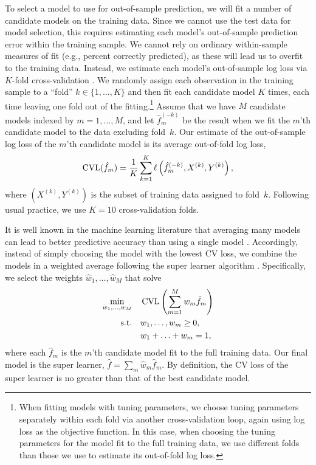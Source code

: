 To select a model to use for out-of-sample prediction, we will fit a number of candidate models on the training data.
Since we cannot use the test data for model selection, this requires estimating each model's out-of-sample prediction error within the training sample.
We cannot rely on ordinary within-sample measures of fit (e.g., percent correctly predicted), as these will lead us to overfit to the training data.
Instead, we estimate each model's out-of-sample log loss via $K$-fold cross-validation \citep[241--249]{Hastie:2009wpa}.
We randomly assign each observation in the training sample to a ``fold'' $k \in \{1, \ldots, K\}$ and then fit each candidate model $K$ times, each time leaving one fold out of the fitting.\footnote{
  When fitting models with tuning parameters, we choose tuning parameters separately within each fold via another cross-validation loop, again using log loss as the objective function.
  In this case, when choosing the tuning parameters for the model fit to the full training data, we use different folds than those we use to estimate its out-of-fold log loss.
}
Assume that we have $M$ candidate models indexed by $m = 1, \ldots, M$, and let $\hat{f}_m^{(-k)}$ be the result when we fit the $m$'th candidate model to the data excluding fold~$k$.
Our estimate of the out-of-sample log loss of the $m$'th candidate model is its average out-of-fold log loss,
\begin{equation}
  \label{eq:cv-loss}
  \operatorname{CVL}(\hat{f}_m)
  =
  \frac{1}{K} \sum_{k=1}^K \ell \left(
    \hat{f}_m^{(-k)}, X^{(k)}, Y^{(k)}
  \right),
\end{equation}
where $(X^{(k)}, Y^{(k)})$ is the subset of training data assigned to fold~$k$.
Following usual practice, we use $K = 10$ cross-validation folds.

It is well known in the machine learning literature that averaging many models can lead to better predictive accuracy than using a single model \citep{breiman_bagging_1996}.
Accordingly, instead of simply choosing the model with the lowest CV loss, we combine the models in a weighted average following the super learner algorithm \citep{vanderLaan:bz}.
Specifically, we select the weights $\hat{w}_1, \ldots, \hat{w}_M$ that solve
\begin{equation}
  \label{eq:super-learner}
  \begin{aligned}
    \min_{w_1, \ldots, w_M}
    &\quad
    \operatorname{CVL} \left(
      \sum_{m=1}^M w_m \hat{f}_m
    \right)
    \\
    \mbox{s.t.}
    &\quad
    w_1, \ldots, w_m \geq 0,
    \\
    &\quad
    w_1 + \ldots + w_m = 1,
  \end{aligned}
\end{equation}
where each $\hat{f}_m$ is the $m$'th candidate model fit to the full training data.
Our final model is the super learner, $\hat{f} = \sum_m \hat{w}_m \hat{f}_m$.
By definition, the CV loss of the super learner is no greater than that of the best candidate model.

